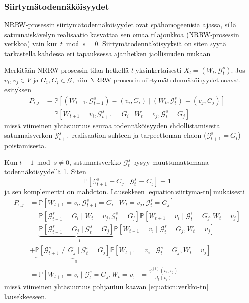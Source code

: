 \documentclass[finnish, 12pt, a4paper, sci, utf8, pdfa]{aaltothesis}
\newcommand*{\prob}{\mathbb{P}}
\begin{document}
\subsubsection{Siirtymätodennäköisyydet}

NRRW-prosessin siirtymätodennäköisyydet ovat epähomogeenisia ajassa, sillä satunnaiskävelyn realisaatio kasvattaa sen omaa tilajoukkoa (NRRW-prosessin verkkoa) vain kun $ t \bmod s = 0 $. Siirtymätodennäköisyyksiä on siten syytä tarkastella kahdessa eri tapauksessa ajanhetken jaollisuuden mukaan. 

Merkitään NRRW-prosessin tilaa hetkellä $ t $ yksinkertaisesti $ X_{t} = (W_{t}, \mathcal{G}^{s}_{t}) $. Jos $ v_{i}, v_{j} \in V $ ja $ G_{i}, G_{j} \in \mathcal{G} $, niin NRRW-prosessin siirtymätodennäköisyydet saavat esityksen
\begin{align*}
   P_{i,j} &= \prob \left[ (W_{t+1}, \mathcal{G}^{s}_{t+1}) = (v_{i}, G_{i}) \mid (W_{t}, \mathcal{G}^{s}_{t}) = (v_{j}, G_{j}) \right] \\
   \quad &= \prob \left[ W_{t+1} = v_{i}, \mathcal{G}^{s}_{t+1} = G_{i} \mid W_{t} = v_{j}, \mathcal{G}^{s}_{t} = G_{j} \right]
   \label{equation:siirtyma-tn}
\end{align*}
missä viimeinen yhtäsuuruus seuraa todennäköisyyden ehdollistamisesta satunnaisverkon $ \mathcal{G}^{s}_{t+1} $ realisaation suhteen ja tarpeettoman ehdon ($ \mathcal{G}^{s}_{t+1} = G_{i} $) poistamisesta.

\vspace{1cm}

Kun $ t + 1 \bmod s \neq 0 $, satunnaisverkko $ \mathcal{G}^{s}_{t} $ pysyy muuttumattomana todennäköisyydellä 1. Siten
\[
   \prob \left[ \mathcal{G}^{s}_{t+1} = G_{j} \mid \mathcal{G}^{s}_{t} = G_{j} \right] = 1
\]
ja sen komplementti on mahdoton. Lausekkeen \ref{equation:siirtyma-tn} mukaisesti
\begin{align*}
   P_{i,j} &= \prob \left[ W_{t+1} = v_{i}, \mathcal{G}^{s}_{t+1} = G_{i} \mid W_{t} = v_{j}, \mathcal{G}^{s}_{t} = G_{j} \right] \\
   \quad &= \prob \left[ \mathcal{G}^{s}_{t+1} = G_{i} \mid W_{t} = v_{j}, \mathcal{G}^{s}_{t} = G_{j} \right] \prob \left[ W_{t+1} = v_{i} \mid \mathcal{G}^{s}_{t} = G_{j}, W_{t} = v_{j} \right] \\
   \quad &= \underbrace{\prob \left[ \mathcal{G}^{s}_{t+1} = G_{j} \mid \mathcal{G}^{s}_{t} = G_{j} \right]}_{= 1} \prob \left[ W_{t+1} = v_{i} \mid \mathcal{G}^{s}_{t} = G_{j}, W_{t} = v_{j} \right] \\
   \quad & + \underbrace{\prob \left[ \mathcal{G}^{s}_{t+1} \neq G_{j} \mid \mathcal{G}^{s}_{t} = G_{j} \right]}_{= 0} \prob \left[ W_{t+1} = v_{i} \mid \mathcal{G}^{s}_{t} = G_{j}, W_{t} = v_{j} \right] \\
   \quad &= \prob \left[ W_{t+1} = v_{i} \mid \mathcal{G}^{s}_{t} = G_{j}, W_{t} = v_{j} \right] = \frac{\psi^{(t)}(v_{i}, v_{j})}{d_{t}(v_{i})}
\end{align*}
missä viimeinen yhtäsuuruus pohjautuu kaavan \ref{equation:verkko-tn} lausekkeeseen.
\end{document}
